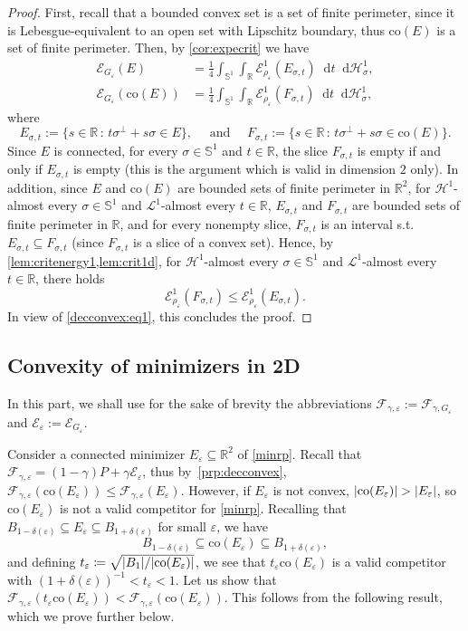 \documentclass[JEP,XML,SOM,Unicode,published]{cedram}
\newcommand{\sep}{\,:\,}
\numberwithin{equation}{section}
\theoremstyle{plain}
\theoremstyle{definition}
\newcommand{\numberset}[1]{{\mathbb{#1}}}
\newcommand{\R}{\numberset{R}}
\newcommand{\dt}{\mathop{}\mathopen{}\mathrm{d}t}
\newcommand{\dH}{\mathop{}\mathopen{}\mathrm{d}\mathscr{H}}
\newcommand{\bbS}{\mathbb{S}}
\newcommand{\calE}{{\mathcal{E}}}
\newcommand{\calF}{{\mathcal{F}}}
\newcommand{\calH}{{\mathscr{H}}}
\newcommand{\calL}{{\mathscr{L}}}
\let\eps\varepsilon
\newcommand{\co}{{\mathrm{co}}}
\newcommand{\subsq}{\subseteq}
\DeclarePairedDelimiter{\abs}{\lvert}{\rvert}
\begin{document}
\begin{proof}
First, recall that a bounded convex set is a set of finite perimeter, since it is
Lebesgue-equivalent to an open set with Lipschitz boundary, thus $\co(E)$ is a set of finite
perimeter.
Then, by \cref{cor:expecrit} we have
\begin{equation}\label{decconvex:eq1}
\begin{split}
\calE_{G_\eps}(E)
&=\frac{1}{4} \int_{\bbS^1} \int_\R \calE^1_{\rho_\eps}(E_{\sigma,t}) \dt\dH^1_\sigma,
\\
\calE_{G_\eps}(\co(E))
&=\frac{1}{4} \int_{\bbS^1} \int_\R \calE^1_{\rho_\eps}(F_{\sigma,t}) \dt\dH^1_\sigma,
\end{split}
\end{equation}
where
\[
E_{\sigma,t} := \bigl\{ s\in\R\sep  t\sigma^\perp+s\sigma\in E\bigr\},
\quad\text{ and }\quad
F_{\sigma,t} := \bigl\{ s\in\R\sep  t\sigma^\perp+s\sigma\in \co(E)\bigr\}.
\]
Since $E$ is connected, for every $\sigma\in\bbS^1$ and $t\in\R$, the slice
$F_{\sigma,t}$ is empty if and only if $E_{\sigma,t}$ is empty (this is the argument which is valid
in dimension $2$ only).
In addition, since $E$ and $\co(E)$ are bounded sets of finite perimeter in $\R^2$, for
$\calH^1$-almost every $\sigma\in\bbS^1$ and $\calL^1$-almost every $t\in\R$, $E_{\sigma,t}$ and
$F_{\sigma,t}$ are bounded sets of finite perimeter in $\R$, and for every nonempty slice,
$F_{\sigma,t}$ is an interval s.t. $E_{\sigma,t}\subsq F_{\sigma,t}$ (since $F_{\sigma,t}$ is a
slice of a convex set). Hence, by \cref{lem:critenergy1,lem:crit1d}, for $\calH^1$-almost every
$\sigma\in\bbS^1$ and $\calL^1$-almost every $t\in\R$, there holds
\[
\calE_{\rho_\eps}^1(F_{\sigma,t})\leq\calE_{\rho_\eps}^1(E_{\sigma,t}).
\]
In view of \cref{decconvex:eq1}, this concludes the proof.
\end{proof}

\subsection{Convexity of minimizers in 2D}\label{subsec:minconv}

In this part, we shall use for the sake of brevity the abbreviations
$\calF_{\gamma,\eps}:=\calF_{\gamma,G_\eps}$ and $\calE_{\eps}:=\calE_{G_\eps}$.

Consider a connected minimizer $E_\eps\subsq\R^2$ of \cref{minrp}. Recall that
$\calF_{\gamma,\eps}=(1-\gamma)P+\gamma\calE_\eps$, thus by~\cref{prp:decconvex},
$\calF_{\gamma,\eps}(\co(E_\eps))\leq\calF_{\gamma,\eps}(E_\eps)$.
However, if $E_\eps$ is not convex, $\abs{\co(E_\eps)}>\abs{E_\eps}$, so $\co(E_\eps)$ is not a
valid competitor for \cref{minrp}. Recalling that $B_{1-\delta(\eps)} \subsq E_\eps \subsq
B_{1+\delta(\eps)}$ for small $\eps$, we have
\[
B_{1-\delta(\eps)} \subsq \co(E_\eps) \subsq B_{1+\delta(\eps)},
\]
and defining $t_\eps\coloneqq \sqrt{\abs{B_1}/\abs{\co(E_\eps)}}$, we see that
$t_\eps\co(E_\eps)$ is a valid competitor with $(1+\delta(\eps))^{-1}<t_\eps<1$. Let us show that
$\calF_{\gamma,\eps}(t_\eps\co(E_\eps))<\calF_{\gamma,\eps}(\co(E_\eps))$. This follows from the
following result, which we prove further below.
\end{document}
